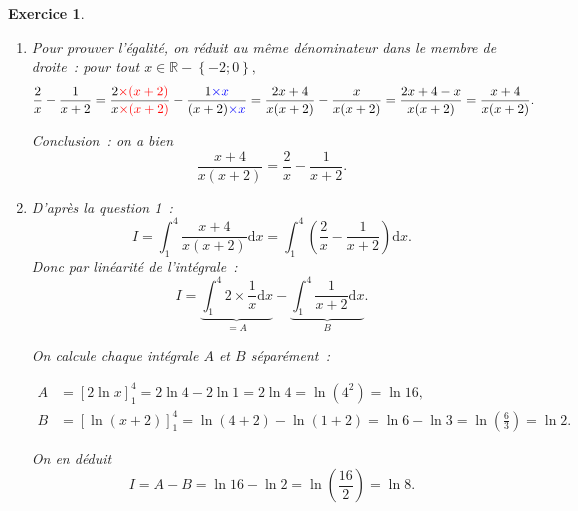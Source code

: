 \documentclass[10pt]{article}
\newtheorem{exo}{Exercice}
\begin{document}
\begin{exo}

\begin{enumerate}
\item Pour prouver l'égalité, on réduit au même dénominateur dans le membre de droite~: pour tout $x\in\mathbb{R}-\left\{-2;0\right\},$
\[
\frac{2}{x}-\frac{1}{x+2}=\frac{2\textcolor{red}{\times(x+2)}}{x\textcolor{red}{\times(x+2)}}-\frac{1\textcolor{blue}{\times x}}{(x+2)\textcolor{blue}{\times x}}
=\frac{2x+4}{x(x+2)}-\frac{x}{x(x+2)}=\frac{2x+4-x}{x(x+2)}=\frac{x+4}{x(x+2)}.
\]

Conclusion~: on a bien \[\frac{x+4}{x(x+2)}=\frac{2}{x}-\frac{1}{x+2}.\]

\item D'après la question 1~:
\[I=\int_1^{4}\frac{x+4}{x(x+2)}\mathrm{d}x=\int_1^{4}\left(\frac{2}{x}-\frac{1}{x+2}\right)\mathrm{d}x.\] Donc par linéarité de l'intégrale~:
\[I=\underbrace{\int_1^{4}2\times\frac{1}{x}\mathrm{d}x}_{=A}-\underbrace{\int_1^{4}\frac{1}{x+2}\mathrm{d}x}_{B}.\]

On calcule chaque intégrale $A$ et $B$ séparément~:

\begin{align*}
A&=\left[2\ln x\right]_1^4=2\ln 4-2\ln 1=2\ln 4=\ln\left(4^2\right)=\ln 16,\\
B&=\left[\ln (x+2)\right]_1^4=\ln(4+2)-\ln(1+2)=\ln 6-\ln 3=\ln\left(\frac{6}{3}\right)=\ln 2.
\end{align*}

On en déduit
\[I=A-B=\ln 16-\ln 2=\ln\left(\frac{16}{2}\right)=\ln 8.\]

\end{enumerate}

\end{exo}
\end{document}
